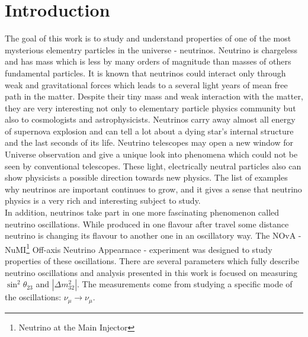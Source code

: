 \chapter{Introduction}
\label{intro_chapter}

The goal of this work is to study and understand properties of one of the most 
mysterious elementry particles in the universe - neutrinos. Neutrino is chargeless and 
has mass which is less by many orders of magnitude than masses of others fundamental 
particles. It is known that neutrinos could interact only through weak and 
gravitational forces which leads to a several light years of mean free path in 
the matter. Despite their tiny mass and weak interaction with the matter, they are 
very interesting not only to elementary particle physics community but also to 
cosmologists and astrophysicists. Neutrinos carry away almost all energy of supernova 
explosion and can tell a lot about a dying star's internal structure and the last 
seconds of its life. Neutrino telescopes may open a new window for Universe observation 
and give a unique look into phenomena which could not be seen by conventional 
telescopes. These light, electrically neutral particles also can show physicists 
a possible direction towards new physics. The list of examples why neutrinos are 
important continues to grow, and it gives a sense that neutrino physics is a 
very rich and interesting subject to study.\\

In addition, neutrinos take part in one more fascinating phenomenon called neutrino
oscillations. While produced in one flavour after travel some distance neutrino is 
changing its flavour to another one in an oscillatory way. The NOvA - 
NuMI\footnote{Neutrino at the Main Injector} Off-axis Neutrino Appearnace - experiment
was designed to study properties of these oscillations. There are several
parameters which fully describe neutrino oscillations and analysis presented in this work 
is focused on measuring $\sin^2\theta_{23}$ and $|\Delta m^2_{32}|$. The measurements 
come from studying a specific mode of the oscillations: $\nu_\mu \rightarrow \nu_\mu$.

